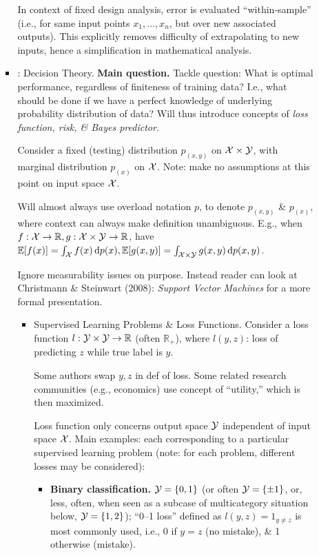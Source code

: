 \documentclass{article}
\begin{document}
\begin{enumerate}
\begin{itemize}
\begin{itemize}
			In context of fixed design analysis, error is evaluated ``within-sample'' (i.e., for same input points $x_1,\ldots,x_n$, but over new associated outputs). This explicitly removes difficulty of extrapolating to new inputs, hence a simplification in mathematical analysis.
			\item {: Decision Theory.} {\bf Main question.} Tackle question: What is optimal performance, regardless of finiteness of training data? I.e., what should be done if we have a perfect knowledge of underlying probability distribution of data? Will thus introduce concepts of {\it loss function, risk, \& Bayes predictor}.
			
			Consider a fixed (testing) distribution $p_{(x,y)}$ on ${\cal X}\times{\cal Y}$, with marginal distribution $p_{(x)}$ on ${\cal X}$. Note: make no assumptions at this point on input space ${\cal X}$.
			
			Will almost always use overload notation $p$, to denote $p_{(x,y)}$ \& $p_{(x)}$, where context can always make definition unambiguous. E.g., when $f:{\cal X}\to\mathbb{R},g:{\cal X}\times{\cal Y}\to\mathbb{R}$, have $\mathbb{E}[f(x)] = \int_{{\cal X}} f(x)\,{\rm d}p(x),\mathbb{E}[g(x,y)] = \int_{{\cal X}\times{\cal Y}} g(x,y)\,{\rm d}p(x,y)$.
			
			Ignore measurability issues on purpose. Instead reader can look at Christmann \& Steinwart (2008): {\it Support Vector Machines} for a more formal presentation.
			\begin{itemize}
				\item {\sf Supervised Learning Problems \& Loss Functions.} Consider a loss function $l:{\cal Y}\times{\cal Y}\to\mathbb{R}$ (often $\mathbb{R}_+$), where $l(y,z)$: loss of predicting $z$ while true label is $y$.
				
				Some authors swap $y,z$ in def of loss. Some related research communities (e.g., economics) use concept of ``utility,'' which is then maximized.
				
				Loss function only concerns output space ${\cal Y}$ independent of input space ${\cal X}$. Main examples: each corresponding to a particular supervised learning problem (note: for each problem, different losses may be considered):
				\begin{itemize}
					\item {\bf Binary classification.} ${\cal Y} = \{0,1\}$ (or often ${\cal Y} = \{\pm1\}$, or, less, often, when seen as a subcase of multicategory situation below, ${\cal Y} = \{1,2\}$); ``0--1 loss'' defined as $l(y,z) = 1_{y\ne z}$ is most commonly used, i.e., 0 if $y = z$ (no mistake), \& 1 otherwise (mistake).
					

\end{itemize}
\end{itemize}
\end{itemize}
\end{itemize}
\end{enumerate}
\end{document}
